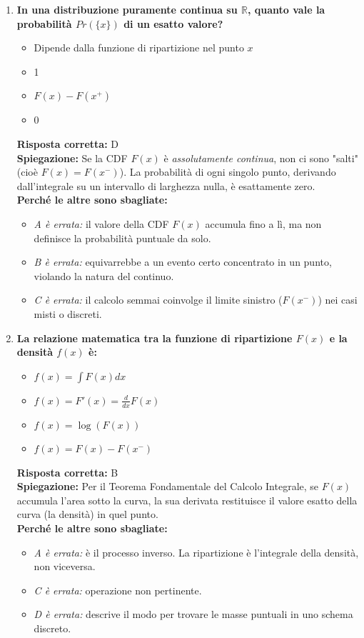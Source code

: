 \documentclass[12pt, a4paper]{article}
\begin{document}
\begin{enumerate}[label=\textbf{\arabic*.}]
    \item \textbf{In una distribuzione puramente continua su $\mathbb{R}$, quanto vale la probabilità $Pr(\{x\})$ di un esatto valore?}
    \begin{itemize}
        \item[A)] Dipende dalla funzione di ripartizione nel punto $x$
        \item[B)] 1
        \item[C)] $F(x) - F(x^+)$
        \item[D)] 0
    \end{itemize}
    \textbf{Risposta corretta:} D \\
    \textbf{Spiegazione:} Se la CDF $F(x)$ è \textit{assolutamente continua}, non ci sono "salti" (cioè $F(x) = F(x^-)$). La probabilità di ogni singolo punto, derivando dall'integrale su un intervallo di larghezza nulla, è esattamente zero. \\
    \textbf{Perché le altre sono sbagliate:}
    \begin{itemize}
        \item \textit{A è errata:} il valore della CDF $F(x)$ accumula fino a lì, ma non definisce la probabilità puntuale da solo.
        \item \textit{B è errata:} equivarrebbe a un evento certo concentrato in un punto, violando la natura del continuo.
        \item \textit{C è errata:} il calcolo semmai coinvolge il limite sinistro ($F(x^-)$) nei casi misti o discreti.
    \end{itemize}

    \item \textbf{La relazione matematica tra la funzione di ripartizione $F(x)$ e la densità $f(x)$ è:}
    \begin{itemize}
        \item[A)] $f(x) = \int F(x) dx$
        \item[B)] $f(x) = F'(x) = \frac{d}{dx}F(x)$
        \item[C)] $f(x) = \log(F(x))$
        \item[D)] $f(x) = F(x) - F(x^-)$
    \end{itemize}
    \textbf{Risposta corretta:} B \\
    \textbf{Spiegazione:} Per il Teorema Fondamentale del Calcolo Integrale, se $F(x)$ accumula l'area sotto la curva, la sua derivata restituisce il valore esatto della curva (la densità) in quel punto. \\
    \textbf{Perché le altre sono sbagliate:}
    \begin{itemize}
        \item \textit{A è errata:} è il processo inverso. La ripartizione è l'integrale della densità, non viceversa.
        \item \textit{C è errata:} operazione non pertinente.
        \item \textit{D è errata:} descrive il modo per trovare le masse puntuali in uno schema discreto.
    \end{itemize}


\end{enumerate}
\end{document}
